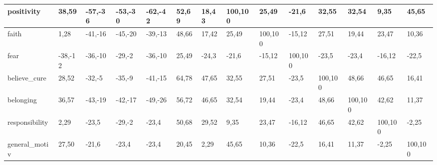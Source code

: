 \begin{table}[H]
\begin{adjustbox}{angle=270}
\begin{tabular} {|l|l|l|l|l|l|l|l|l|l|l|l|l|l|}
 \hline 
 positivity & {\color{green}38,59} & {\color{red}-57,-36} & {\color{red}-53,-30} & {\color{red}-62,-42} & {\color{green}52,69} & {\color{green}18,43} & {\color{green}100,100} & {\color{green}25,49} & -21,6 & {\color{green}32,55} & {\color{green}32,54} & {\color{green}9,35} & {\color{green}45,65} \\ 
 \hline 
 faith & {\color{green}1,28} & {\color{red}-41,-16} & {\color{red}-45,-20} & {\color{red}-39,-13} & {\color{green}48,66} & {\color{green}17,42} & {\color{green}25,49} & {\color{green}100,100} & -15,12 & {\color{green}27,51} & {\color{green}19,44} & {\color{green}23,47} & {\color{green}10,36} \\ 
 \hline 
 fear & {\color{red}-38,-12} & {\color{red}-36,-10} & {\color{red}-29,-2} & {\color{red}-36,-10} & {\color{green}25,49} & -24,3 & -21,6 & -15,12 & {\color{green}100,100} & -23,5 & -23,4 & -16,12 & -22,5 \\ 
 \hline 
 believe\_cure & {\color{green}28,52} & {\color{red}-32,-5} & {\color{red}-35,-9} & {\color{red}-41,-15} & {\color{green}64,78} & {\color{green}47,65} & {\color{green}32,55} & {\color{green}27,51} & -23,5 & {\color{green}100,100} & {\color{green}48,66} & {\color{green}46,65} & {\color{green}16,41} \\ 
 \hline 
 belonging & {\color{green}36,57} & {\color{red}-43,-19} & {\color{red}-42,-17} & {\color{red}-49,-26} & {\color{green}56,72} & {\color{green}46,65} & {\color{green}32,54} & {\color{green}19,44} & -23,4 & {\color{green}48,66} & {\color{green}100,100} & {\color{green}42,62} & {\color{green}11,37} \\ 
 \hline 
 responsibility & {\color{green}2,29} & -23,5 & {\color{red}-29,-2} & -23,4 & {\color{green}50,68} & {\color{green}29,52} & {\color{green}9,35} & {\color{green}23,47} & -16,12 & {\color{green}46,65} & {\color{green}42,62} & {\color{green}100,100} & -2,25 \\ 
 \hline 
 general\_motiv & {\color{green}27,50} & -21,6 & -23,4 & -23,4 & {\color{green}20,45} & {\color{green}2,29} & {\color{green}45,65} & {\color{green}10,36} & -22,5 & {\color{green}16,41} & {\color{green}11,37} & -2,25 & {\color{green}100,100} \\ 
 \hline 
 \hline 
 \end{tabular} 
\end{adjustbox}  
\end{table} 
